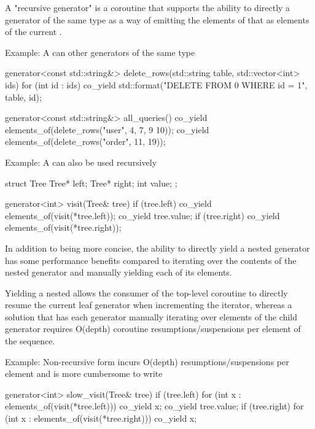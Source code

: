 \documentclass{wg21}
\begin{document}
A "recursive generator" is a coroutine that supports the ability to directly 
a generator of the same type as a way of emitting the elements of that 
as elements of the current .

Example: A  can  other generators of the same type
\begin{colorblock}
    generator<const std::string&> delete_rows(std::string table, std::vector<int> ids) {
        for (int id : ids) {
            co_yield std::format("DELETE FROM {0} WHERE id = {1}", table, id);
        }
    }
    
    generator<const std::string&> all_queries() {
        co_yield elements_of(delete_rows("user", {4, 7, 9 10}));
        co_yield elements_of(delete_rows("order", {11, 19}));
    }
\end{colorblock}

Example: A  can also be used recursively
\begin{colorblock}
    struct Tree {
        Tree* left;
        Tree* right;
        int value;
    };
    
    generator<int> visit(Tree& tree) {
        if (tree.left) co_yield elements_of(visit(*tree.left));
        co_yield tree.value;
        if (tree.right) co_yield elements_of(visit(*tree.right));
    }
\end{colorblock}

In addition to being more concise, the ability to directly yield a nested generator has some
performance benefits compared to iterating over the contents of the nested generator and
manually yielding each of its elements.

Yielding a nested  allows the consumer of the top-level coroutine to
directly resume the current leaf generator when incrementing the iterator, whereas a solution that has each generator manually iterating over elements of the child generator
requires O(depth) coroutine resumptions/suspensions per element of the sequence.

Example: Non-recursive form incurs O(depth) resumptions/suspensions per element
and is more cumbersome to write

\begin{colorblock}
    generator<int> slow_visit(Tree& tree) {
        if (tree.left) {
            for (int x : elements_of(visit(*tree.left)))
            co_yield x;
        }
        co_yield tree.value;
        if (tree.right) {
            for (int x : elements_of(visit(*tree.right)))
            co_yield x;
        }
    }
\end{colorblock}
\end{document}
